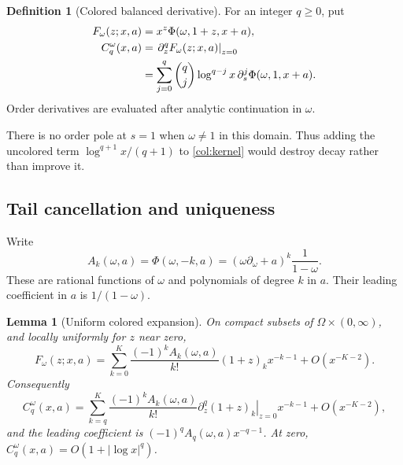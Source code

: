 \documentclass[11pt,a4paper]{article}
\numberwithin{equation}{section}
\newtheorem{lemma}[theorem]{Lemma}
\theoremstyle{definition}
\newtheorem{definition}[theorem]{Definition}
\theoremstyle{remark}
\begin{document}
\begin{definition}[Colored balanced derivative]\label{col:def}
For an integer $q\ge0$, put
\begin{align}
 F_\omega(z;x,a)&=x^z\Phi(\omega,1+z,x+a),\label{col:generator}\\
 C_q^\omega(x,a)&=\left.\partial_z^qF_\omega(z;x,a)\right|_{z=0}\notag\\
 &=\sum_{j=0}^q\binom qj\log^{q-j}x\,
       \partial_s^j\Phi(\omega,1,x+a).\label{col:kernel}
\end{align}
Order derivatives are evaluated after analytic continuation in $\omega$.
\end{definition}

There is no order pole at $s=1$ when $\omega\ne1$ in this domain.
Thus adding the uncolored term $\log^{q+1}x/(q+1)$ to
\eqref{col:kernel} would destroy decay rather than improve it.

\subsection{Tail cancellation and uniqueness}

Write
\begin{equation}\label{col:A}
 A_k(\omega,a)=\Phi(\omega,-k,a)
       =(\omega\partial_\omega+a)^k\frac1{1-\omega}.
\end{equation}
These are rational functions of $\omega$ and polynomials of degree $k$
in $a$. Their leading coefficient in $a$ is $1/(1-\omega)$.

\begin{lemma}[Uniform colored expansion]\label{col:tail}
On compact subsets of $\Omega\times(0,\infty)$, and locally uniformly
for $z$ near zero,
\begin{equation}\label{col:F-tail}
 F_\omega(z;x,a)=
  \sum_{k=0}^{K}\frac{(-1)^k A_k(\omega,a)}{k!}
           (1+z)_k x^{-k-1}+O(x^{-K-2}).
\end{equation}
Consequently
\begin{equation}\label{col:C-tail}
 C_q^\omega(x,a)=
  \sum_{k=q}^{K}\frac{(-1)^k A_k(\omega,a)}{k!}
   \left.\partial_z^q(1+z)_k\right|_{z=0}x^{-k-1}
       +O(x^{-K-2}),
\end{equation}
and the leading coefficient is
$(-1)^q A_q(\omega,a)x^{-q-1}$.
At zero, $C_q^\omega(x,a)=O(1+|\log x|^q)$.
\end{lemma}
\end{document}

